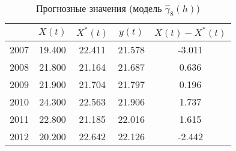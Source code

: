 \begin{table}[ht]
\centering
\caption{Прогнозные значения (модель $ \widehat{\gamma}_8(h) $)} 
\label{table:auto-class-26-prediction}
\begin{tabular}{r|cccc}
  \hline
 & $X(t)$ & $X^{*}(t)$ & $y(t)$ & $ X(t) - X^{*}(t) $ \\ 
  \hline
2007 & 19.400 & 22.411 & 21.578 & -3.011 \\ 
  2008 & 21.800 & 21.164 & 21.687 & 0.636 \\ 
  2009 & 21.900 & 21.704 & 21.797 & 0.196 \\ 
  2010 & 24.300 & 22.563 & 21.906 & 1.737 \\ 
  2011 & 22.800 & 21.185 & 22.016 & 1.615 \\ 
  2012 & 20.200 & 22.642 & 22.126 & -2.442 \\ 
   \hline
\end{tabular}
\end{table}
